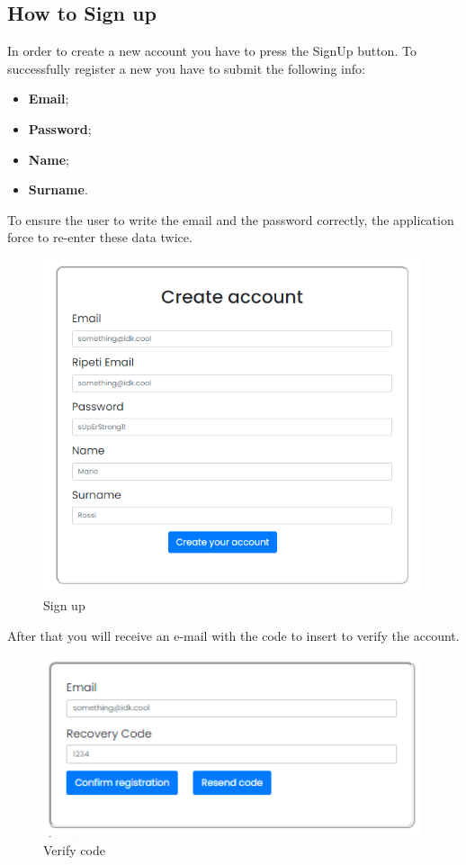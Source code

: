 \subsection{How to Sign up} \label{_signup}
In order to create a new account you have to press the SignUp button. To successfully register a new you have to submit the following info:
\begin{itemize} 
    \item \textbf{Email};
    \item \textbf{Password};
    \item \textbf{Name};
    \item \textbf{Surname}.
\end{itemize}
To ensure the user to write the email and the password correctly, the application force to re-enter these data twice.

\begin{figure}[H]
    \centering
    \includegraphics[width=30em]{res/images/cliente/signup.png}
    \caption{Sign up}
\end{figure}

After that you will receive an e-mail with the code to insert to verify the account.

\begin{figure}[H]
    \centering
    \includegraphics[width=30em]{res/images/cliente/verify.png}
    \caption{Verify code}
\end{figure}


